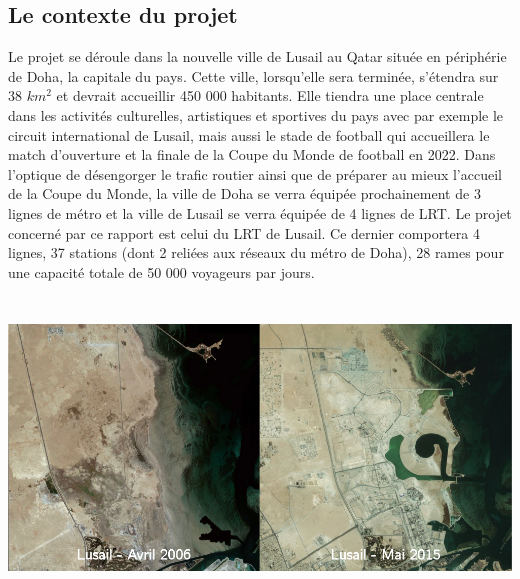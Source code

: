 \subsection{Le contexte du projet} Le projet se déroule dans la nouvelle ville de Lusail au Qatar située en périphérie de Doha, la capitale du pays. Cette ville, lorsqu'elle sera terminée, s'étendra sur 38 \begin{math} km^2 \end{math} et devrait accueillir 450 000 habitants. Elle tiendra une place centrale dans les activités culturelles, artistiques et sportives du pays avec par exemple le circuit international de Lusail, mais aussi le stade de football qui accueillera le match d'ouverture et la finale de la Coupe du Monde de football en 2022. Dans l'optique de désengorger le trafic routier ainsi que de préparer au mieux l'accueil de la Coupe du Monde, la ville de Doha se verra équipée prochainement de 3 lignes de métro et la ville de Lusail se verra équipée de 4 lignes de LRT. Le projet concerné par ce rapport est celui du LRT de Lusail. Ce dernier comportera 4 lignes, 37 stations (dont 2 reliées aux réseaux du métro de Doha), 28 rames pour une capacité totale de 50 000 voyageurs par jours.

\begin{center}
\includegraphics[height=8cm]{ressources/images/figures/Lusail.png}
\end{center}

